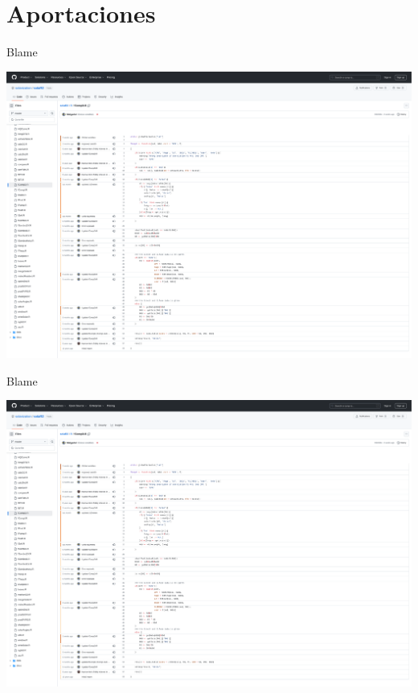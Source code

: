 \documentclass[aspectratio=169, usenames,svgnames,dvipsnames]{beamer}
\begin{document}
\section{Aportaciones}
\label{sec:org93a9bb7}
\begin{frame}[label={sec:org8c4218f}]{Blame}
\begin{center}
\includegraphics[height=0.9\textheight]{../figuras/blame-fCompD.pdf}
\end{center}
\end{frame}
\begin{frame}[label={sec:org4644089}]{Blame}
\begin{center}
\includegraphics[width=\textwidth]{../figuras/blame-fCompD_cropped.pdf}
\end{center}
\end{frame}
\end{document}
